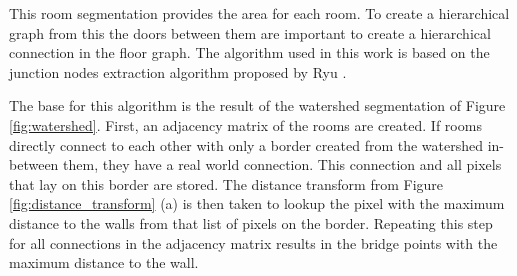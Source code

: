 This room segmentation provides the area for each room. To create a hierarchical graph from this the doors between them are important to create a hierarchical connection in the floor graph. The algorithm used in this work is based on the junction nodes extraction algorithm proposed by Ryu \cite{ryu_hierarchical_2020}. 

The base for this algorithm is the result of the watershed segmentation of Figure \ref{fig:watershed}. First, an adjacency matrix of the rooms are created. If rooms directly connect to each other with only a border created from the watershed in-between them, they have a real world connection. This connection and all pixels that lay on this border are stored. The distance transform from Figure \ref{fig:distance_transform} (a) is then taken to lookup the pixel with the maximum distance to the walls from that list of pixels on the border. Repeating this step for all connections in the adjacency matrix results in the bridge points with the maximum distance to the wall. 

